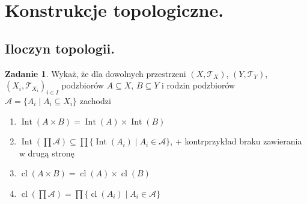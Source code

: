 \documentclass{article}
\theoremstyle{definition}%
\theoremstyle{theorem}
\newtheorem{zad}{Zadanie}
\newcommand{\sT}{\mathcal{T}} %
\DeclareMathOperator{\cl}{cl} %
\DeclareMathOperator{\Int}{Int} %
\begin{document}
	\section{Konstrukcje topologiczne.}
	\subsection{Iloczyn topologii.}
	\begin{zad}
		Wykaż, że dla dowolnych przestrzeni $(X,\sT_X)$, $(Y,\sT_Y)$,$(X_i,\sT_{X_i})_{i\in I}$ podzbiorów $A\subseteq X$, $B\subseteq Y$ i rodzin podzbiorów $\mathcal{A}=\{A_i \mid A_i\subseteq X_i\}$ zachodzi 
		\begin{enumerate}
			\item $\Int(A\times B)=\Int(A)\times \Int(B)$
			\item $\Int(\prod \mathcal{A}) \subseteq \prod \{\Int(A_i) \mid A_i \in \mathcal{A}\}$, + kontrprzykład braku zawierania w drugą stronę
			\item $\cl(A\times B) = \cl(A) \times \cl(B)$
			\item $\cl(\prod \mathcal{A}) = \prod \{\cl(A_i) \mid A_i \in \mathcal{A} \}$
		\end{enumerate}
	
	\end{zad}
\end{document}

